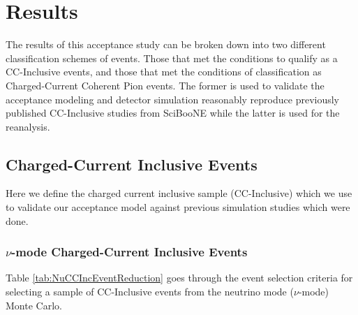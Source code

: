 \documentclass[11pt]{article}
\begin{document}
\section{Results}\label{sec:Results}
The results of this acceptance study can be broken down into two different classification schemes of events. Those that met the conditions to qualify as a CC-Inclusive events, and those that met the conditions of classification as Charged-Current Coherent Pion events. The former is used to validate the acceptance modeling and detector simulation reasonably reproduce previously published CC-Inclusive studies from SciBooNE while the latter is used for the reanalysis.

\subsection{Charged-Current Inclusive Events}\label{sub:CCInclusive}

Here we define the charged current inclusive sample (CC-Inclusive) which we use to validate our acceptance model against previous simulation studies which were done. 

\subsubsection{$\nu$-mode Charged-Current Inclusive Events}\label{sub:NuModeCCInclusive}
Table \ref*{tab:NuCCIncEventReduction} goes through the event selection criteria for selecting a sample of CC-Inclusive events from the neutrino mode ($\nu$-mode) Monte Carlo.
\end{document}

